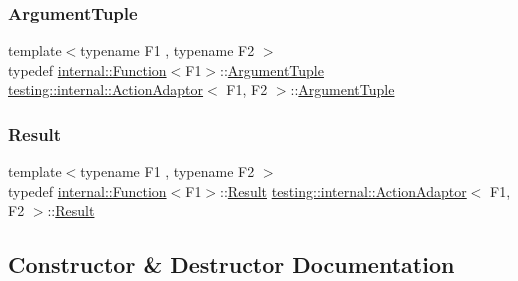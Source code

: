 \subsubsection{\texorpdfstring{Argument\+Tuple}{ArgumentTuple}}
{\footnotesize\ttfamily template$<$typename F1 , typename F2 $>$ \\
typedef \hyperlink{structtesting_1_1internal_1_1_function}{internal\+::\+Function}$<$F1$>$\+::\hyperlink{classtesting_1_1internal_1_1_action_adaptor_a4f78fb73f97b72fea8a93b78a8ab5704}{Argument\+Tuple} \hyperlink{classtesting_1_1internal_1_1_action_adaptor}{testing\+::internal\+::\+Action\+Adaptor}$<$ F1, F2 $>$\+::\hyperlink{classtesting_1_1internal_1_1_action_adaptor_a4f78fb73f97b72fea8a93b78a8ab5704}{Argument\+Tuple}}

\mbox{\label{classtesting_1_1internal_1_1_action_adaptor_afa8f7872b6db3d8f1545fd98b45b0b95}} 
\subsubsection{\texorpdfstring{Result}{Result}}
{\footnotesize\ttfamily template$<$typename F1 , typename F2 $>$ \\
typedef \hyperlink{structtesting_1_1internal_1_1_function}{internal\+::\+Function}$<$F1$>$\+::\hyperlink{classtesting_1_1internal_1_1_action_adaptor_afa8f7872b6db3d8f1545fd98b45b0b95}{Result} \hyperlink{classtesting_1_1internal_1_1_action_adaptor}{testing\+::internal\+::\+Action\+Adaptor}$<$ F1, F2 $>$\+::\hyperlink{classtesting_1_1internal_1_1_action_adaptor_afa8f7872b6db3d8f1545fd98b45b0b95}{Result}}



\subsection{Constructor \& Destructor Documentation}
\mbox{\label{classtesting_1_1internal_1_1_action_adaptor_a24ba3330ef3cc365b956c50ec73e4177}} 
